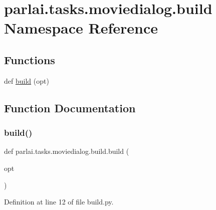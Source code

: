 \hypertarget{namespaceparlai_1_1tasks_1_1moviedialog_1_1build}{}\section{parlai.\+tasks.\+moviedialog.\+build Namespace Reference}
\label{namespaceparlai_1_1tasks_1_1moviedialog_1_1build}
\subsection*{Functions}
\begin{DoxyCompactItemize}
\item 
def \hyperlink{namespaceparlai_1_1tasks_1_1moviedialog_1_1build_a844c68eb87eb666ec20f2b507813469a}{build} (opt)
\end{DoxyCompactItemize}


\subsection{Function Documentation}
\mbox{\label{namespaceparlai_1_1tasks_1_1moviedialog_1_1build_a844c68eb87eb666ec20f2b507813469a}} 
\subsubsection{\texorpdfstring{build()}{build()}}
{\footnotesize\ttfamily def parlai.\+tasks.\+moviedialog.\+build.\+build (\begin{DoxyParamCaption}\item[{}]{opt }\end{DoxyParamCaption})}



Definition at line 12 of file build.\+py.

